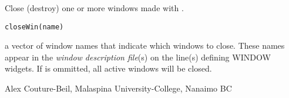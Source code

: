 \documentclass[letterpaper]{book}
\begin{document}
\begin{Description}\relax
Close (destroy) one or more windows made with .
\end{Description}
\begin{Usage}
\begin{verbatim}closeWin(name)\end{verbatim}
\end{Usage}
\begin{Arguments}
\begin{ldescription}
\item[\code{name}] a vector of window names that indicate which windows to close. These 
names appear in the \emph{window description file}(s) on the line(s) defining WINDOW widgets.
If  is ommitted, all active windows will be closed.
\end{ldescription}
\end{Arguments}
\begin{Author}\relax
Alex Couture-Beil, Malaspina University-College, Nanaimo BC
\end{Author}
\begin{SeeAlso}\relax
{}
\end{SeeAlso}
\end{document}
